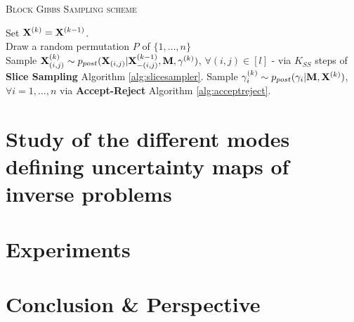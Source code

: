 {\fontsize{4}{4}\selectfont
\begin{algorithm}[t]
\caption{\textsc{Block Gibbs Sampling scheme}}

    {%
    Set $\mathbf{X}^{(k)} = \mathbf{X}^{(k-1)}$.\\
    		{
    		Draw a random permutation $P$ of $\{1,\ldots,n\}$\\
    			{
			Sample $\mathbf{X}_{(i,j)}^{(k)} \sim p_{post}(\mathbf{X}_{(i,j)}|\mathbf{X}_{-(i,j)}^{(k-1)},\mathbf{M},\gamma^{(k)})$, $\forall (i,j)\in [l]$ - via $K_{SS}$ steps of \textbf{Slice Sampling} Algorithm \ref{alg:slicesampler}.
			}
		}
	{Sample $\gamma^{(k)}_{i} \sim p_{post}(\gamma_{i}|\mathbf{M},\mathbf{X}^{(k)})$, $\forall i =1,\ldots,n$ via \textbf{Accept-Reject} Algorithm \ref{alg:acceptreject}.}

    }
\label{alg:sampling}
\end{algorithm}
}

\section{Study of the different modes defining uncertainty maps of inverse problems}

\section{Experiments}

\section{Conclusion \& Perspective}
\label{sec:Dis}

